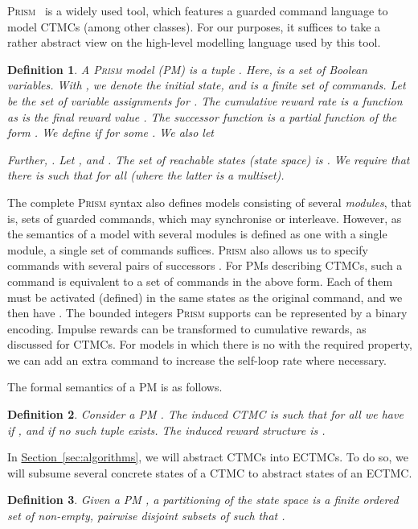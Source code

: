 \documentclass[10pt,twocolumn]{article}
\newtheorem{definition}{Definition}
\newcommand{\PRISM}{\textsc{Prism}\xspace}
\newcommand{\refsec}[1]{\texorpdfstring{\hyperref[sec:#1]{Section~\ref*{sec:#1}}}{Section~\ref*{sec:#1}}}
\begin{document}
\noindent\PRISM~\cite{KNP11} is a widely used tool, which features a guarded command language to model CTMCs (among other classes).
For our purposes, it suffices to take a rather abstract view on the high-level modelling language used by this tool.
\begin{definition}
\label{def:prism-model}
  A \emph{\PRISM model (PM)} is a tuple .
  Here,  is a set of Boolean \emph{variables}. With ,
  we denote the \emph{initial state}, and  is a finite set of \emph{commands}.
  Let  be the set of variable assignments for .
  The \emph{cumulative reward rate} is a function  as is the \emph{final reward value} .
  The \emph{successor function} is a partial function of the form .
  We define  if  for some .
  We also let

Further, .
  Let , and .
  The set of \emph{reachable states (state space)} is .
  We require that there is  such that  for all  (where the latter is a multiset).
\end{definition}
The complete \PRISM syntax also defines models consisting of several \emph{modules}, that is, sets of guarded commands, which may synchronise or interleave.
However, as the semantics of a model with several modules is defined as one with a single module, a single set of commands suffices.
\PRISM also allows us to specify commands with several pairs of successors .
For PMs describing CTMCs, such a command is equivalent to a set of  commands  in the above form.
Each of them must be activated (defined) in the same states as the original command, and we then have .
The bounded integers \PRISM supports can be represented by a binary encoding.
Impulse rewards can be transformed to cumulative rewards, as discussed for CTMCs.
For models in which there is no  with the required property, we can add an extra command to increase the self-loop rate where necessary.

The formal semantics of a PM is as follows.
\begin{definition}
\label{def:induced-ctmc-rewards}
  Consider a PM  .
  The \emph{induced CTMC} is  
such that for all  we have
 if , and  if no such tuple exists.
  The \emph{induced reward structure} is .
\end{definition}

In \refsec{algorithms}, we will abstract CTMCs into ECTMCs.
To do so, we will subsume several concrete states of a CTMC to abstract states of an ECTMC.
\begin{definition}
  \label{def:partitioning}
  Given a PM , a \emph{partitioning} of the state space
   is a finite ordered set  of
  non-empty, pairwise disjoint subsets of  such that
  .  
\end{definition}
\end{document}
